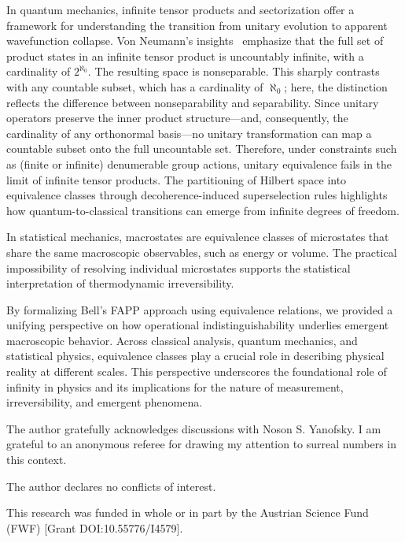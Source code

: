 \documentclass[shortAfour,sageh,times]{sagej}
\begin{document}
In quantum mechanics, infinite tensor products and sectorization offer a framework for understanding the transition from unitary evolution to apparent wavefunction collapse.
Von Neumann's insights~\citep{vonNeumann1939} emphasize that the full set of product states in an infinite tensor product is uncountably infinite, with a cardinality of \(2^{\aleph_0}\).
The resulting space is nonseparable.
This sharply contrasts with any countable subset, which has a cardinality of \(\aleph_0\); here, the distinction reflects the difference between nonseparability and separability.
Since unitary operators preserve the inner product structure---and, consequently, the cardinality of any orthonormal basis---no unitary transformation can map a countable subset onto the full uncountable set.
Therefore, under constraints such as (finite or infinite) denumerable  group actions, unitary equivalence fails in the limit of infinite tensor products.
The partitioning of Hilbert space into equivalence classes through decoherence-induced superselection rules highlights how quantum-to-classical transitions can emerge from infinite degrees of freedom.

In statistical mechanics, macrostates are equivalence classes of microstates that share the same macroscopic observables, such as energy or volume. The practical impossibility of resolving individual microstates supports the statistical interpretation of thermodynamic irreversibility.

By formalizing Bell's FAPP approach using equivalence relations, we provided a unifying perspective on how operational indistinguishability underlies emergent macroscopic behavior. Across classical analysis, quantum mechanics, and statistical physics, equivalence classes play a crucial role in describing physical reality at different scales. This perspective underscores the foundational role of infinity in physics and its implications for the nature of measurement, irreversibility, and emergent phenomena.

\begin{acks}
The author gratefully acknowledges discussions with Noson S. Yanofsky.
I am grateful to an anonymous referee for drawing my attention to surreal numbers in this context.
\end{acks}

\begin{dci}
The author declares no conflicts of interest.
\end{dci}

\begin{funding}
This research was funded in whole or in part by the Austrian Science Fund (FWF) [Grant DOI:10.55776/I4579].
\end{funding}



\end{document}
